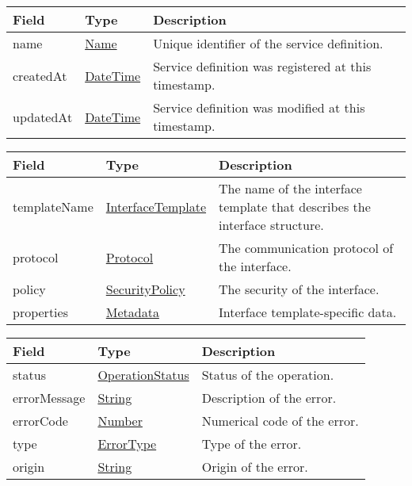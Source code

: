 \documentclass[a4paper]{arrowhead}
\newcommand{\pref}[1]{{\textcolor{ArrowheadGrey}{\hyperref[sec:model:primitives:#1]{#1}}}}
\begin{document}
\label{sec:model:ServiceDefinitionDescriptor}
 
\begin{table}[ht!]
\begin{tabularx}{\textwidth}{| p{3cm} | p{4cm} | X |} \hline
\rowcolor{gray!33} Field & Type      & Description \\ \hline
name & \pref{Name} & Unique identifier of the service definition. \\ \hline
createdAt & \pref{DateTime} & Service definition was registered at this timestamp. \\ \hline
updatedAt & \pref{DateTime} & Service definition was modified at this timestamp. \\ \hline
\end{tabularx}
\end{table}

\label{sec:model:ServiceInterfaceRequest}
 
\begin{table}[ht!]
\begin{tabularx}{\textwidth}{| p{3cm} | p{3.5cm} | X |} \hline
\rowcolor{gray!33} Field & Type & Description \\ \hline
templateName & \pref{InterfaceTemplate} & The name of the interface template that describes the interface structure. \\ \hline
protocol & \pref{Protocol} & The communication protocol of the interface. \\ \hline
policy & \pref{SecurityPolicy} & The security of the interface. \\ \hline
properties &\hyperref[sec:model:Metadata]{Metadata} & Interface template-specific data. \\ \hline
\end{tabularx}
\end{table}

\label{sec:model:ErrorResponse}

\begin{table}[ht!]
\begin{tabularx}{\textwidth}{| p{4.25cm} | p{3.5cm} | X |} \hline
\rowcolor{gray!33} Field & Type      & Description \\ \hline
status & \pref{OperationStatus} & Status of the operation. \\ \hline
errorMessage & \pref{String} & Description of the error. \\ \hline
errorCode &\pref{Number}  & Numerical code of the error. \\ \hline
type & \pref{ErrorType} & Type of the error. \\ \hline
origin & \pref{String} & Origin of the error. \\ \hline
\end{tabularx}
\end{table}
\end{document}
